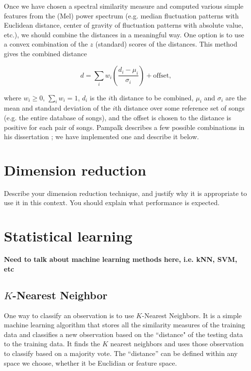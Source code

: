 \documentclass[12pt]{article}
\begin{document}
Once we have chosen a spectral similarity measure and computed various simple features from the (Mel) power spectrum (e.g. median fluctuation patterns with Euclidean distance, center of gravity of fluctuation patterns with absolute value, etc.), we should combine the distances in a meaningful way.  One option is to use a convex combination of the $z$ (standard) scores of the distances.  This method gives the combined distance

\[ d = \sum_{i} w_i \left(\dfrac{d_i - \mu_i}{\sigma_i}\right) + \text{offset}, \] 

\noindent where $w_i\ge 0$, $\sum_i w_i=1$, $d_i$ is the $i$th distance to be combined, $\mu_i$ and $\sigma_i$ are the mean and standard deviation of the $i$th distance over some reference set of songs (e.g. the entire database of songs), and the offset is chosen to the distance is positive for each pair of songs.  Pampalk describes a few possible combinations in his dissertation \cite{pampalk:dissertation}; we have implemented one and describe it below.\\


\section{Dimension reduction}
Describe your dimension reduction technique, and justify why it 
is appropriate to use it in this context. You should explain what 
performance is expected.
\section{Statistical learning}
\textbf{Need to talk about machine learning methods here, i.e. kNN, SVM, etc}
\subsection{$K$-Nearest Neighbor} 
One way to classify an observation is to use $K$-Nearest Neighbors. It is a simple machine learning algorithm that stores all the similarity measures of the training data and classifies a new observation based on the ``distance" of the testing data to the training data. It finds the  $K$ nearest neighbors and uses those observation to classify based on a majority vote. The ``distance'' can be defined within any space we choose, whether it be Euclidian or feature space.  
\end{document}
